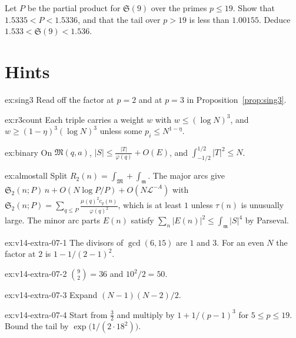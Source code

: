 \begin{exercise}[$\star\star\star$]\label{ex:v14-extra-07-4}
Let $P$ be the partial product for $\mathfrak S(9)$ over the primes $p\le19$. Show that $1.5335<P<1.5336$, and that the tail over $p>19$ is less than $1.00155$. Deduce $1.533<\mathfrak S(9)<1.536$.
\end{exercise}

\section{Hints}

\begin{hint}{ex:sing3}
Read off the factor at $p=2$ and at $p=3$ in Proposition~\ref{prop:sing3}.
\end{hint}
\begin{hint}{ex:r3count}
Each triple carries a weight $w$ with $w\le(\log N)^3$, and $w\ge(1-\eta)^3(\log N)^3$ unless some $p_i\le N^{1-\eta}$.
\end{hint}
\begin{hint}{ex:binary}
On $\mathfrak M(q,a)$, $|S|\le\frac{|T|}{\varphi(q)}+O(E)$, and $\int_{-1/2}^{1/2}|T|^2\le N$.
\end{hint}
\begin{hint}{ex:almostall}
Split $R_2(n)=\int_{\mathfrak M}+\int_{\mathfrak m}$. The major arcs give $\mathfrak S_2(n;P)\,n+O(N\log P/P)+O(N\mathcal L^{-A})$ with $\mathfrak S_2(n;P)=\sum_{q\le P}\frac{\mu(q)^2c_q(n)}{\varphi(q)^2}$, which is at least $1$ unless $\tau(n)$ is unusually large. The minor arc parts $E(n)$ satisfy $\sum_n|E(n)|^2\le\int_{\mathfrak m}|S|^4$ by Parseval.
\end{hint}
\begin{hint}{ex:v14-extra-07-1}
The divisors of $\gcd(6,15)$ are $1$ and $3$. For an even $N$ the factor at $2$ is $1-1/(2-1)^2$.
\end{hint}

\begin{hint}{ex:v14-extra-07-2}
$\binom92=36$ and $10^2/2=50$.
\end{hint}

\begin{hint}{ex:v14-extra-07-3}
Expand $(N-1)(N-2)/2$.
\end{hint}

\begin{hint}{ex:v14-extra-07-4}
Start from $\frac32$ and multiply by $1+1/(p-1)^3$ for $5\le p\le19$. Bound the tail by $\exp\bigl(1/(2\cdot18^2)\bigr)$.
\end{hint}

